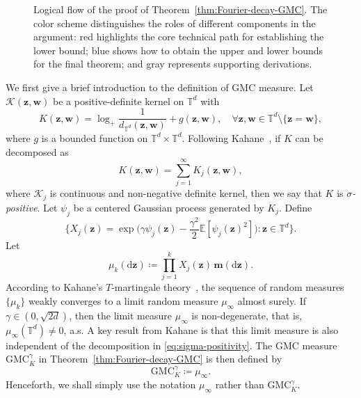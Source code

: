 \documentclass[12pt]{amsart}
\theoremstyle{definition}
\theoremstyle{remark}
\newcommand{\bz}{\boldsymbol{z}}
\newcommand{\bw}{\boldsymbol{w}}
\newcommand{\E}{\mathbb{E}}
\newcommand{\T}{\mathbb{T}}
\newcommand{\GMC}{\mathrm{GMC}}
\numberwithin{equation}{section}
\begin{document}
\begin{figure}[!htbp]
	\caption{Logical flow of the proof of Theorem~\ref{thm:Fourier-decay-GMC}. The color scheme distinguishes the roles of different components in the argument: red highlights the core technical path for establishing the lower bound; blue shows how to obtain the upper and lower bounds for the final theorem; and gray represents supporting derivations.}
	\label{fig:proof_flow}
\end{figure}

We first give a brief introduction to the definition of GMC measure. Let $\mathcal{K}(\bz,\bw)$ be a positive-definite kernel on $\T^d$ with
\[
K(\bz,\bw)=\log_+ \frac{1}{d_{\T^d}(\bz,\bw)}+g(\bz,\bw),\quad \forall \bz,\bw\in \T^d\setminus \{\bz=\bw\},
\]
where $g$ is a bounded function on $\T^d\times \T^d$. Following Kahane~\cite{Kah85}, if $K$ can be decomposed as
\begin{equation}\label{eq:sigma-positivity}
K(\bz,\bw)=\sum_{j=1}^\infty K_{j}(\bz,\bw),
\end{equation}
where $\mathcal{K}_j$ is continuous and non-negative definite kernel, then we say that $K$ is \textit{$\sigma$-positive}. Let $\psi_j$ be a centered Gaussian process generated by $K_j$. Define
\begin{equation}\label{eq:def-Xj}
\Big\{X_j(\bz)=\exp\big(\gamma\psi_j(\bz)-\frac{\gamma^2}{2}\E[\psi_j(\bz)^2]\big):\bz\in \T^d\Big\}.
\end{equation}
Let
\[
\mu_k(\mathrm{d}\bz)\coloneq \prod_{j=1}^k X_j(\bz)\,\boldsymbol{m}(\mathrm{d}\bz).
\]
According to Kahane's $T$-martingale theory~\cite{Kah87}, the sequence of random measures $\{\mu_k\}$ weakly converges to a limit random measure $\mu_{\infty}$ almost surely. If $\gamma\in (0,\sqrt{2d})$, then the limit measure $\mu_\infty$ is non-degenerate, that is, $\mu_\infty(\T^d)\ne 0$, a.s. A key result from Kahane is that this limit measure is also independent of the decomposition in \eqref{eq:sigma-positivity}. The GMC measure $\GMC_K^\gamma$ in Theorem~\ref{thm:Fourier-decay-GMC} is then defined by
\[
\GMC_K^\gamma\coloneq \mu_\infty.
\]
Henceforth, we shall simply use the notation $\mu_\infty$ rather than $\GMC_K^\gamma$.
\end{document}
